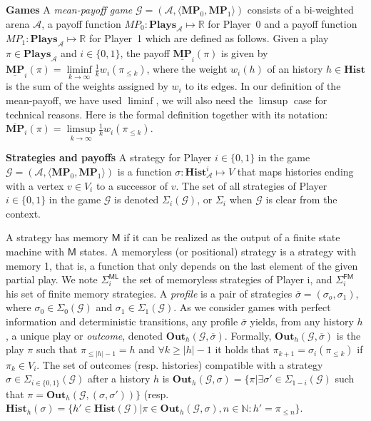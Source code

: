 \noindent\textbf{Games} A \textit{mean-payoff game} $\mathcal{G} = (\mathcal{A},\langle \mathbf{MP}_0, \mathbf{MP}_1\rangle)$ consists of a bi-weighted arena $\mathcal{A}$, a payoff function $MP_0 : \mathbf{Plays}_{\mathcal{A}} \mapsto \mathbb{R}$ for Player~0 and a payoff function $MP_1 : \mathbf{Plays}_{\mathcal{A}} \mapsto \mathbb{R}$ for Player~1 which are defined as follows. Given a play $\pi \in \mathbf{Plays}_{\mathcal{A}}$ and $i \in \{0,1\}$, the payoff $\underline{\mathbf{MP}}_i(\pi)$ is given by $\underline{\mathbf{MP}}_i(\pi) = \liminf\limits_{k \to \infty} \frac{1}{k}w_i(\pi_{\leqslant k}) $, where the weight $w_i(h)$ of an history $h \in \mathbf{Hist}$ is the sum of the weights assigned by $w_i$ to its edges. In our definition of the mean-payoff, we have used $\liminf$, we will also need the $\limsup$ case for technical reasons. Here is the formal definition together with its notation: $\overline{\mathbf{MP}}_i(\pi) = \limsup\limits_{k \to \infty} \frac{1}{k}w_i(\pi_{\leqslant k}) $.

\textbf{Strategies and payoffs} A strategy for Player $i \in \{0,1\}$ in the game $\mathcal{G} = (\mathcal{A},\langle \mathbf{MP}_0, \mathbf{MP}_1\rangle)$ is a function $\sigma: \mathbf{Hist}^i_{\mathcal{A}} \mapsto V$ that maps histories ending with a vertex $v \in V_i$ to a successor of $v$. The set of all strategies of Player $i \in \{0,1\}$ in the game $\mathcal{G}$ is denoted $\Sigma_i(\mathcal{G})$, or $\Sigma_i$ when $\mathcal{G}$ is clear from the context.

A strategy has memory $\mathsf{M}$ if it can be realized as the output of a finite state machine with $\mathsf{M}$ states. A memoryless (or positional) strategy is a strategy with memory 1, that is, a function that only depends on the last element of the given partial play. We note $\Sigma^{\mathsf{ML}}_i$ the set of memoryless strategies of Player i, and $\Sigma^{\mathsf{FM}}_i$ his set of finite memory strategies. A \textit{profile} is a pair of strategies $\overline{\sigma} = (\sigma_o, \sigma_1)$, where $\sigma_0 \in \Sigma_0(\mathcal{G})$ and $\sigma_1 \in \Sigma_1(\mathcal{G})$. As we consider games with perfect information and deterministic transitions, any profile $\overline{\sigma}$ yields, from any history $h$, a unique play or \textit{outcome}, denoted $\mathbf{Out}_h(\mathcal{G}, \overline{\sigma})$. Formally, $\mathbf{Out}_h(\mathcal{G}, \overline{\sigma})$ is the play $\pi$ such that $\pi_{\leqslant|h|-1} = h$ and $\forall k \geqslant |h|-1$ it holds that $\pi_{k+1}=\sigma_i(\pi_{\leqslant k})$ if $\pi_k \in V_i$. The set of outcomes (resp. histories) compatible with a strategy $\sigma \in \Sigma_{i\in\{0,1\}}(\mathcal{G})$ after a history $h$ is $\mathbf{Out}_h(\mathcal{G}, \sigma) = \{ \pi | \exists \sigma'\in \Sigma_{1-i}(\mathcal{G}) $ such that $\pi = \mathbf{Out}_h(\mathcal{G}, (\sigma,\sigma'))\}$ (resp. $\mathbf{Hist}_h(\sigma) = \{h' \in \mathbf{Hist}(\mathcal{G}) | \pi \in \mathbf{Out}_h(\mathcal{G}, \sigma), n \in \mathbb{N}:h'= \pi_{\leqslant n}\}$.

